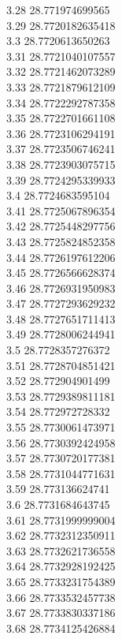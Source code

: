 {3.28	28.771974699565\\
3.29	28.7720182635418\\
3.3	28.7720613650263\\
3.31	28.7721040107557\\
3.32	28.7721462073289\\
3.33	28.7721879612109\\
3.34	28.7722292787358\\
3.35	28.7722701661108\\
3.36	28.7723106294191\\
3.37	28.7723506746241\\
3.38	28.7723903075715\\
3.39	28.7724295339933\\
3.4	28.7724683595104\\
3.41	28.7725067896354\\
3.42	28.7725448297756\\
3.43	28.7725824852358\\
3.44	28.7726197612206\\
3.45	28.7726566628374\\
3.46	28.7726931950983\\
3.47	28.7727293629232\\
3.48	28.7727651711413\\
3.49	28.7728006244941\\
3.5	28.7728357276372\\
3.51	28.7728704851421\\
3.52	28.772904901499\\
3.53	28.7729389811181\\
3.54	28.772972728332\\
3.55	28.7730061473971\\
3.56	28.7730392424958\\
3.57	28.7730720177381\\
3.58	28.7731044771631\\
3.59	28.773136624741\\
3.6	28.7731684643745\\
3.61	28.7731999999004\\
3.62	28.7732312350911\\
3.63	28.7732621736558\\
3.64	28.7732928192425\\
3.65	28.7733231754389\\
3.66	28.7733532457738\\
3.67	28.7733830337186\\
3.68	28.7734125426884\\
}
